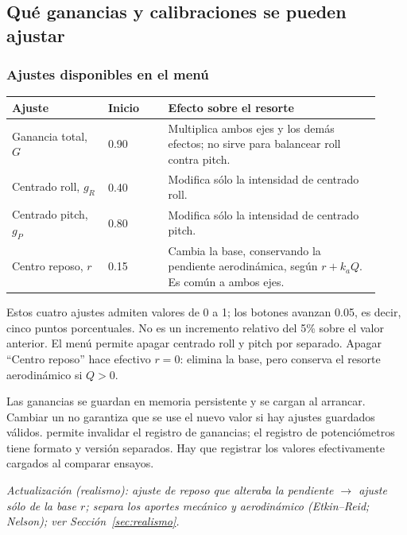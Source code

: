 \documentclass[11pt,a4paper]{article}
\newcommand{\code}[1]{\texttt{\detokenize{#1}}}
\begin{document}
\subsection{Qué ganancias y calibraciones se pueden ajustar}
\subsubsection{Ajustes disponibles en el menú}
\begin{longtable}{p{0.24\linewidth}p{0.15\linewidth}p{0.53\linewidth}}
\toprule Ajuste & Inicio & Efecto sobre el resorte\\\midrule\endhead
Ganancia total, $G$ & 0.90 & Multiplica ambos ejes y los demás efectos; no sirve para balancear roll contra pitch.\\
Centrado roll, $g_R$ & 0.40 & Modifica sólo la intensidad de centrado roll.\\
Centrado pitch, $g_P$ & 0.80 & Modifica sólo la intensidad de centrado pitch.\\
Centro reposo, $r$ & 0.15 & Cambia la base, conservando la pendiente aerodinámica, según $r+k_aQ$. Es común a ambos ejes.\\
\bottomrule
\end{longtable}
Estos cuatro ajustes admiten valores de 0 a 1; los botones avanzan 0.05, es decir, cinco puntos porcentuales. No es un incremento relativo del 5\% sobre el valor anterior. El menú permite apagar centrado roll y pitch por separado. Apagar ``Centro reposo'' hace efectivo $r=0$: elimina la base, pero conserva el resorte aerodinámico si $Q>0$.

Las ganancias se guardan en memoria persistente y se cargan al arrancar. Cambiar un \code{define} no garantiza que se use el nuevo valor si hay ajustes guardados válidos. \code{YOKE_SETTINGS_VERSION} permite invalidar el registro de ganancias; el registro de potenciómetros tiene formato y versión separados. Hay que registrar los valores efectivamente cargados al comparar ensayos.

\textit{Actualización (realismo): ajuste de reposo que alteraba la pendiente $\rightarrow$ ajuste sólo de la base $r$; separa los aportes mecánico y aerodinámico (Etkin--Reid; Nelson); ver Sección~\ref{sec:realismo}.}
\end{document}
